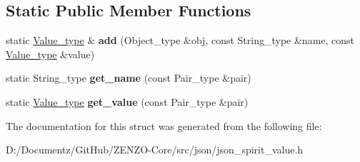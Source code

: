 \subsection*{Static Public Member Functions}
\begin{DoxyCompactItemize}
\item 
\mbox{\label{structjson__spirit_1_1_config__map_aef0dfe17dd6bb674f65a7c631189f1d0}} 
static \mbox{\hyperlink{classjson__spirit_1_1_value__impl}{Value\+\_\+type}} \& {\bfseries add} (Object\+\_\+type \&obj, const String\+\_\+type \&name, const \mbox{\hyperlink{classjson__spirit_1_1_value__impl}{Value\+\_\+type}} \&value)
\item 
\mbox{\label{structjson__spirit_1_1_config__map_ab42f4902cc98efa53ce2ecf905963083}} 
static String\+\_\+type {\bfseries get\+\_\+name} (const Pair\+\_\+type \&pair)
\item 
\mbox{\label{structjson__spirit_1_1_config__map_ad54f20d4aa429741fcdc4627eea1c91a}} 
static \mbox{\hyperlink{classjson__spirit_1_1_value__impl}{Value\+\_\+type}} {\bfseries get\+\_\+value} (const Pair\+\_\+type \&pair)
\end{DoxyCompactItemize}


The documentation for this struct was generated from the following file\+:\begin{DoxyCompactItemize}
\item 
D\+:/\+Documentz/\+Git\+Hub/\+Z\+E\+N\+Z\+O-\/\+Core/src/json/json\+\_\+spirit\+\_\+value.\+h\end{DoxyCompactItemize}
